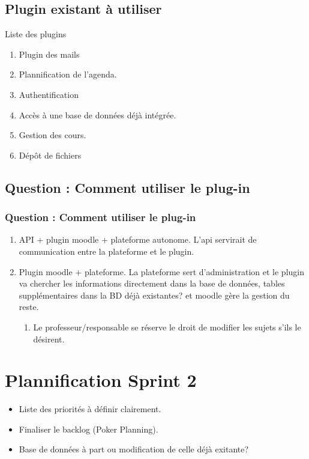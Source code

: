 \documentclass[numbering=fraction]{beamer}
\begin{document}
\subsection{Plugin existant à utiliser}
\begin{frame}{Liste des plugins}
    \begin{enumerate}
     \item Plugin des mails
     \item Plannification de l'agenda.
     \item Authentification
     \item Accès à une base de données déjà intégrée.
     \item Gestion des cours.
     \item Dépôt de fichiers
    \end{enumerate}
\end{frame}
\subsection{Question : Comment utiliser le plug-in}
\begin{frame}
    \frametitle{Question : Comment utiliser le plug-in}
    \begin{enumerate}
        \item API + plugin moodle + plateforme autonome. L'api servirait de communication entre la plateforme et le plugin.
        \item Plugin moodle + plateforme. La plateforme sert d'administration et le plugin va chercher les informations directement dans la base de données, tables supplémentaires dans la BD déjà existantes? et moodle gère la gestion du reste.
        \begin{enumerate}
            \item Le professeur/responsable se réserve le droit de modifier les sujets s'ils le désirent.
        \end{enumerate}
    \end{enumerate}
\end{frame}
\section{Plannification Sprint 2}

\begin{frame}{}
    \begin{itemize}
        \item Liste des priorités à définir clairement.
        \item Finaliser le backlog (Poker Planning).
        \item Base de données à part ou modification de celle déjà exitante?
    \end{itemize}
\end{frame}
\end{document}

